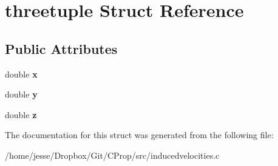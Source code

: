 \hypertarget{structthreetuple}{}\section{threetuple Struct Reference}
\label{structthreetuple}
\subsection*{Public Attributes}
\begin{DoxyCompactItemize}
\item 
\mbox{\label{structthreetuple_ae5f7e8f3a5edb9ad80f3431fead4f643}} 
double {\bfseries x}
\item 
\mbox{\label{structthreetuple_ae266cd73d77b2d14a34c869ba7a2f819}} 
double {\bfseries y}
\item 
\mbox{\label{structthreetuple_a128c51c9378b496e33eddcc9b8c96bc0}} 
double {\bfseries z}
\end{DoxyCompactItemize}


The documentation for this struct was generated from the following file\+:\begin{DoxyCompactItemize}
\item 
/home/jesse/\+Dropbox/\+Git/\+C\+Prop/src/inducedvelocities.\+c\end{DoxyCompactItemize}
